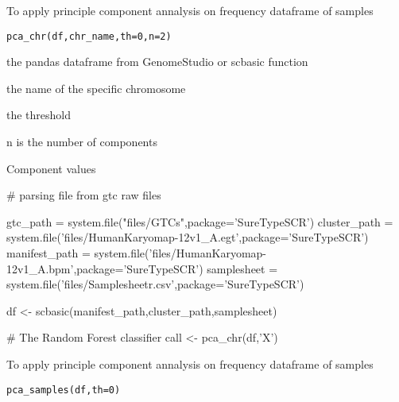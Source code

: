 \documentclass[a4paper]{book}
\begin{document}
%
\begin{Description}\relax
To apply principle component annalysis on frequency dataframe of samples
\end{Description}
%
\begin{Usage}
\begin{verbatim}
pca_chr(df,chr_name,th=0,n=2)
\end{verbatim}
\end{Usage}
%
\begin{Arguments}
\begin{ldescription}
\item[\code{df}] the pandas dataframe from GenomeStudio or scbasic function
\item[\code{chr\_name}] the name of the specific chromosome
\item[\code{th}] the threshold
\item[\code{n}] n is the number of components
\end{ldescription}
\end{Arguments}
%
\begin{Value}
Component values
\end{Value}
%
\begin{Examples}
\begin{ExampleCode}

# parsing file from gtc raw files

gtc_path = system.file("files/GTCs",package='SureTypeSCR')
cluster_path = system.file('files/HumanKaryomap-12v1_A.egt',package='SureTypeSCR')
manifest_path = system.file('files/HumanKaryomap-12v1_A.bpm',package='SureTypeSCR')
samplesheet = system.file('files/Samplesheetr.csv',package='SureTypeSCR')

df <- scbasic(manifest_path,cluster_path,samplesheet)

# The Random Forest classifier
call <- pca_chr(df,'X') 




\end{ExampleCode}
\end{Examples}
%
\begin{Description}\relax
To apply principle component annalysis on frequency dataframe of samples
\end{Description}
%
\begin{Usage}
\begin{verbatim}
pca_samples(df,th=0)
\end{verbatim}
\end{Usage}
\end{document}
